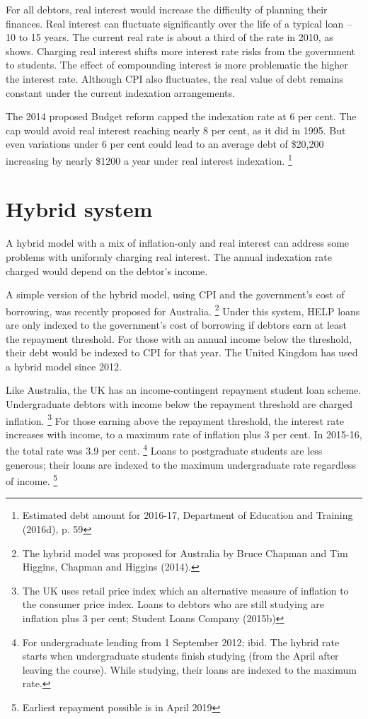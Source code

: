 \documentclass[embargoed]{grattan}
\begin{document}
{For all debtors, real interest would increase the difficulty of planning their finances.
Real interest can fluctuate significantly over the life of a typical loan -- 10 to 15 years.
The current real rate is about a third of the rate in 2010, as  shows.
Charging real interest shifts more interest rate risks from the government to students.
The effect of compounding interest is more problematic the higher the interest rate.
Although \gls{CPI} also fluctuates, the real value of debt remains constant under the current indexation arrangements.

The 2014 proposed Budget reform capped the indexation rate at 6 per cent.
The cap would avoid real interest reaching nearly 8 per cent, as it did in 1995.
But even variations under 6 per cent could lead to an average debt of \$20,200 increasing by nearly \$1200 a year under real interest indexation.%
\footnote{Estimated debt amount for 2016-17, Department of Education and Training (2016d), p. 59}

\section{Hybrid system}\label{sec:hybrid-system}

A hybrid model with a mix of inflation-only and real interest can address some problems with uniformly charging real interest.
The annual indexation rate charged would depend on the debtor's income.

A simple version of the hybrid model, using \gls{CPI} and the government's cost of borrowing, was recently proposed for Australia.%
\footnote{The hybrid model was proposed for Australia by Bruce Chapman and Tim Higgins, Chapman and Higgins (2014).} Under this system, \gls{HELP} loans are only indexed to the government's cost of borrowing if debtors earn at least the repayment threshold.
For those with an annual income below the threshold, their debt would be indexed to \gls{CPI} for that year.
The United Kingdom has used a hybrid model since 2012.

Like Australia, the UK has an income-contingent repayment student loan scheme.
Undergraduate debtors with income below the repayment threshold are charged inflation.%
\footnote{The UK uses retail price index which an alternative measure of inflation to the consumer price index.
Loans to debtors who are still studying are inflation plus 3 per cent; Student Loans Company (2015b)} For those earning above the repayment threshold, the interest rate increases with income, to a maximum rate of inflation plus 3 per cent.
In 2015-16, the total rate was 3.9 per cent.%
\footnote{For undergraduate lending from 1 September 2012; ibid.
The hybrid rate starts when undergraduate students finish studying (from the April after leaving the course).
While studying, their loans are indexed to the maximum rate.} Loans to postgraduate students are less generous; their loans are indexed to the maximum undergraduate rate regardless of income.%
\footnote{Earliest repayment possible is in April 2019}

}
\end{document}
